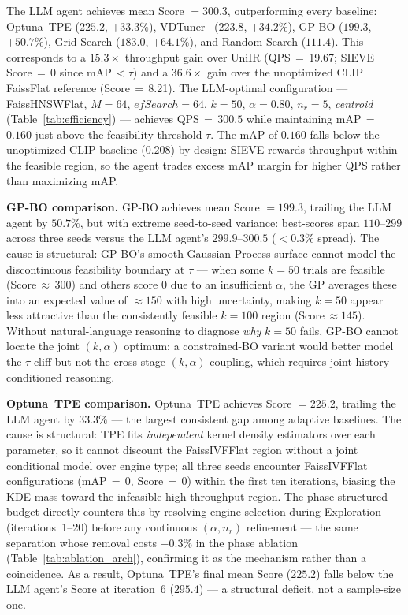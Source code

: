 \documentclass[sigconf, nonacm]{acmart}
\theoremstyle{definition}
\begin{document}
The LLM agent achieves mean Score $= 300.3$, outperforming every baseline:
Optuna~TPE ($225.2$, $\mathbf{+33.3\%}$), VDTuner~\cite{yang2024vdtuner} ($223.8$, $\mathbf{+34.2\%}$), GP-BO ($199.3$, $\mathbf{+50.7\%}$),
Grid Search ($183.0$, $+64.1\%$), and Random Search ($111.4$).
This corresponds to a $\mathbf{15.3\times}$ throughput gain over UniIR
(QPS\,$=$\,19.67; SIEVE Score\,$=$\,$0$ since mAP\,$<\tau$) and a
$\mathbf{36.6\times}$ gain over the unoptimized CLIP FaissFlat reference
(Score\,$=$\,8.21).
The LLM-optimal configuration --- FaissHNSWFlat, $M{=}64$,
$\mathit{efSearch}{=}64$, $k{=}50$, $\alpha{=}0.80$, $n_r{=}5$,
\textit{centroid} (Table~\ref{tab:efficiency}) --- achieves
QPS\,$=$\,$300.5$ while maintaining mAP\,$=$\,$0.160$ just above the
feasibility threshold $\tau$.
The mAP of $0.160$ falls below the unoptimized CLIP baseline ($0.208$) by design:
SIEVE rewards throughput within the feasible region, so the agent trades excess
mAP margin for higher QPS rather than maximizing mAP.

\noindent\textbf{GP-BO comparison.}
GP-BO achieves mean Score $= 199.3$, trailing the LLM agent by $50.7\%$,
but with extreme seed-to-seed variance: best-scores span $110$--$299$ across
three seeds versus the LLM agent's $299.9$--$300.5$ ($<0.3\%$ spread).
The cause is structural: GP-BO's smooth Gaussian Process surface cannot model
the discontinuous feasibility boundary at $\tau$ --- when some $k{=}50$ trials
are feasible (Score\,$\approx$\,$300$) and others score $0$ due to an
insufficient $\alpha$, the GP averages these into an expected value of
$\approx\!150$ with high uncertainty, making $k{=}50$ appear less attractive
than the consistently feasible $k{=}100$ region (Score\,$\approx\!145$).
Without natural-language reasoning to diagnose \emph{why} $k{=}50$ fails,
GP-BO cannot locate the joint $(k,\alpha)$ optimum; a constrained-BO variant
would better model the $\tau$ cliff but not the cross-stage $(k,\alpha)$
coupling, which requires joint history-conditioned reasoning.

\noindent\textbf{Optuna~TPE comparison.}
Optuna~TPE achieves Score $= 225.2$, trailing the LLM agent by
$\mathbf{33.3\%}$ --- the largest consistent gap among adaptive baselines.
The cause is structural: TPE fits \emph{independent} kernel density estimators
over each parameter, so it cannot discount the FaissIVFFlat region without a
joint conditional model over engine type; all three seeds encounter
FaissIVFFlat configurations (mAP\,$=$\,0, Score\,$=$\,0) within the first ten
iterations, biasing the KDE mass toward the infeasible high-throughput region.
The phase-structured budget directly counters this by resolving engine selection
during Exploration (iterations~1--20) before any continuous $(\alpha, n_r)$
refinement --- the same separation whose removal costs $-0.3\%$ in the phase
ablation (Table~\ref{tab:ablation_arch}), confirming it as the mechanism rather
than a coincidence.
As a result, Optuna~TPE's final mean Score ($225.2$) falls below the LLM
agent's Score at iteration~6 ($295.4$) --- a structural deficit, not a
sample-size one.
\end{document}
